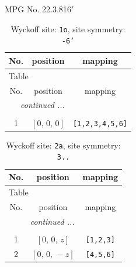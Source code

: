 \documentclass[fleqn,8pt]{jsarticle}
\begin{document}
\setcounter{MaxMatrixCols}{32}

\renewcommand{\tablename}{Table~}
\renewcommand{\figurename}{Figure~}
\begin{center}
\LARGE
MPG No. 22.3.81\quad$\bar{6}'$
\end{center}
\renewcommand{\arraystretch}{1.2}
\begin{longtable}{ccc}
\caption{Wyckoff site: {\tt 1o}, site symmetry: {\tt -6'}}
 \\
 \hline \hline
No. & position & mapping \\ \hline \endfirsthead

\multicolumn{2}{l}{\tablename\ \thetable{}} \\
 \hline \hline
No. & position & mapping \\ \hline \endhead

 \hline \hline
\multicolumn{2}{r}{\footnotesize\it continued ...} \\ \endfoot

 \hline \hline
\multicolumn{2}{r}{} \\ \endlastfoot

1 & $\left[ 0,\, 0,\, 0 \right]$ & {\tt [1,2,3,4,5,6]} \\
\end{longtable}
\renewcommand{\arraystretch}{1.2}
\begin{longtable}{ccc}
\caption{Wyckoff site: {\tt 2a}, site symmetry: {\tt 3..}}
 \\
 \hline \hline
No. & position & mapping \\ \hline \endfirsthead

\multicolumn{2}{l}{\tablename\ \thetable{}} \\
 \hline \hline
No. & position & mapping \\ \hline \endhead

 \hline \hline
\multicolumn{2}{r}{\footnotesize\it continued ...} \\ \endfoot

 \hline \hline
\multicolumn{2}{r}{} \\ \endlastfoot

1 & $\left[ 0,\, 0,\, z \right]$ & {\tt [1,2,3]} \\ \hline
2 & $\left[ 0,\, 0,\, - z \right]$ & {\tt [4,5,6]} \\
\end{longtable}
\renewcommand{\arraystretch}{1.2}
\end{document}
